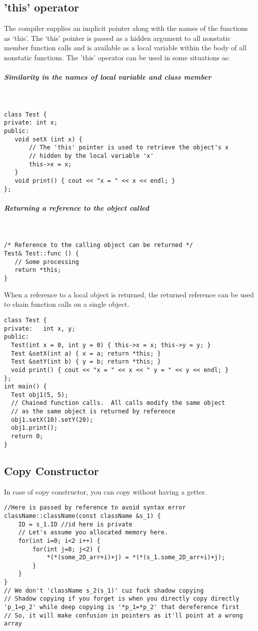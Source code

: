 \documentclass{article}
\begin{document}
\subsection{'this' operator}

The compiler supplies an implicit pointer along with the names of the functions as ‘this’.
The ‘this’ pointer is passed as a hidden argument to all nonstatic member function calls and is available as a local variable within the body of all nonstatic functions. 
The 'this' operator can be used in some situations as:

\subparagraph{Similarity in the names of local variable and class member}
\
\begin{lstlisting}
class Test { 
private: int x; 
public: 
   void setX (int x) { 
       // The 'this' pointer is used to retrieve the object's x 
       // hidden by the local variable 'x' 
       this->x = x; 
   } 
   void print() { cout << "x = " << x << endl; } 
}; 
\end{lstlisting}

\subparagraph{Returning a reference to the object called}
\
\begin{lstlisting}
/* Reference to the calling object can be returned */ 
Test& Test::func () { 
   // Some processing 
   return *this; 
}  
\end{lstlisting}

When a reference to a local object is returned, the returned reference can be used to chain function calls on a single object.
\
\begin{lstlisting}
class Test { 
private:   int x, y; 
public: 
  Test(int x = 0, int y = 0) { this->x = x; this->y = y; } 
  Test &setX(int a) { x = a; return *this; } 
  Test &setY(int b) { y = b; return *this; } 
  void print() { cout << "x = " << x << " y = " << y << endl; } 
}; 
int main() { 
  Test obj1(5, 5); 
  // Chained function calls.  All calls modify the same object 
  // as the same object is returned by reference 
  obj1.setX(10).setY(20); 
  obj1.print(); 
  return 0; 
} 
\end{lstlisting}

\newpage

\subsection{Copy Constructor}

In case of copy constructor, you can copy without having a getter.

\begin{lstlisting}
//Here is passed by reference to avoid syntax error
className::className(const className &s_1) { 
	ID = s_1.ID //id here is private
	// Let's assume you allocated memory here.
	for(int i=0; i<2 i++) {
		for(int j=0; j<2) {
			*(*(some_2D_arr+i)+j) = *(*(s_1.some_2D_arr+i)+j);
		}
	}
}
// We don't 'className s_2(s_1)' cuz fuck shadow copying 
// Shadow copying if you forget is when you directly copy directly 'p_1=p_2' while deep copying is '*p_1=*p_2' that dereference first
// So, it will make confusion in pointers as it'll point at a wrong array
\end{lstlisting}
\end{document}
